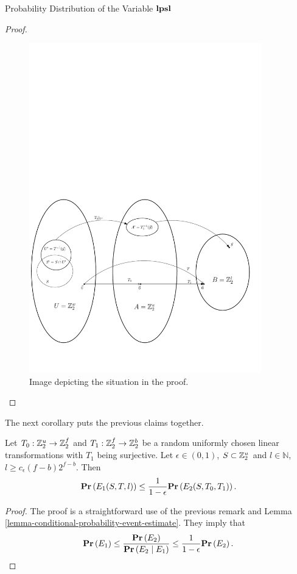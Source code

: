 \begin{section}{Probability Distribution of the Variable \texorpdfstring{$\mathbf{lpsl}$}{lpsl}}
\begin{proof}
\begin{figure}
  \centering
    \includegraphics[width=0.9\textwidth]{images/elpsl_proof}
  \caption{Image depicting the situation in the proof.}
\end{figure}

\end{proof}

The next corollary puts the previous claims together.
\begin{corollary}
\label{corollary-prob-e2-e1}
Let $T_0: \mathbb{Z}_{2}^{u} \rightarrow \mathbb{Z}_{2}^{f}$ and $T_1: \mathbb{Z}_{2}^{f} \rightarrow \mathbb{Z}_{2}^{b}$ be a random uniformly chosen linear transformations with $T_1$ being surjective. Let $\epsilon \in (0, 1)$, $S \subset \mathbb{Z}_{2}^{u}$ and $l \in \mathbb{N}$, $l \geq c_{\epsilon}(f - b)2 ^ {f - b}$. Then
\[
	\mathbf{Pr}\left(E_1(S, T, l)\right) \leq \frac{1}{1 - \epsilon} \mathbf{Pr}\left(E_2(S, T_0, T_1)\right) \text{.}
\]
\end{corollary}
\begin{proof}
The proof is a straightforward use of the previous remark and Lemma \ref{lemma-conditional-probability-event-estimate}. They imply that
\[
	\mathbf{Pr}\left(E_1\right) \leq \frac{\mathbf{Pr}\left(E_2\right)}{\mathbf{Pr}\left(E_2 \mid E_1\right)} \leq \frac{1}{1 - \epsilon}\mathbf{Pr}\left(E_2\right) \text{.}
\]
\end{proof}


\end{section}
